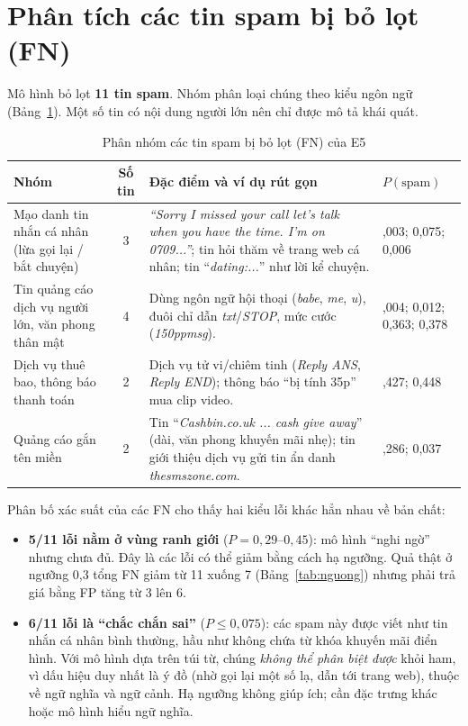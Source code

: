 \section{Phân tích các tin spam bị bỏ lọt (FN)}

Mô hình bỏ lọt \textbf{11 tin spam}. Nhóm phân loại chúng theo kiểu ngôn ngữ (Bảng~\ref{tab:fn}). Một số tin có nội dung người lớn nên chỉ được mô tả khái quát.

\begin{table}[H]
\centering
\caption{Phân nhóm các tin spam bị bỏ lọt (FN) của E5}
\label{tab:fn}
\small
\begin{tabular}{|>{\raggedright\arraybackslash}p{3.2cm}|c|>{\raggedright\arraybackslash}p{5.8cm}|>{\raggedright\arraybackslash}p{3cm}|}
\hline
\textbf{Nhóm} & \textbf{Số tin} & \textbf{Đặc điểm và ví dụ rút gọn} & \textbf{$P(\text{spam})$} \\
\hline
Mạo danh tin nhắn cá nhân (lừa gọi lại / bắt chuyện) & 3 & \textit{``Sorry I missed your call let's talk when you have the time. I'm on 0709...''}; tin hỏi thăm về trang web cá nhân; tin ``\textit{dating:...}'' như lời kể chuyện. & 0,003; 0,075; 0,006 \\
\hline
Tin quảng cáo dịch vụ người lớn, văn phong thân mật & 4 & Dùng ngôn ngữ hội thoại (\textit{babe}, \textit{me}, \textit{u}), đuôi chỉ dẫn \textit{txt}/\textit{STOP}, mức cước (\textit{150ppmsg}). & 0,004; 0,012; 0,363; 0,378 \\
\hline
Dịch vụ thuê bao, thông báo thanh toán & 2 & Dịch vụ tử vi/chiêm tinh (\textit{Reply ANS}, \textit{Reply END}); thông báo ``bị tính 35p'' mua clip video. & 0,427; 0,448 \\
\hline
Quảng cáo gắn tên miền & 2 & Tin ``\textit{Cashbin.co.uk ... cash give away}'' (dài, văn phong khuyến mãi nhẹ); tin giới thiệu dịch vụ gửi tin ẩn danh \textit{thesmszone.com}. & 0,286; 0,037 \\
\hline
\end{tabular}
\end{table}

Phân bố xác suất của các FN cho thấy hai kiểu lỗi khác hẳn nhau về bản chất:

\begin{itemize}
    \item \textbf{5/11 lỗi nằm ở vùng ranh giới} ($P=0{,}29$--$0{,}45$): mô hình ``nghi ngờ'' nhưng chưa đủ. Đây là các lỗi có thể giảm bằng cách hạ ngưỡng. Quả thật ở ngưỡng 0,3 tổng FN giảm từ 11 xuống 7 (Bảng~\ref{tab:nguong}) nhưng phải trả giá bằng FP tăng từ 3 lên 6.
    \item \textbf{6/11 lỗi là ``chắc chắn sai''} ($P\le0{,}075$): các spam này được viết như tin nhắn cá nhân bình thường, hầu như không chứa từ khóa khuyến mãi điển hình. Với mô hình dựa trên túi từ, chúng \textit{không thể phân biệt được} khỏi ham, vì dấu hiệu duy nhất là ý đồ (nhờ gọi lại một số lạ, dẫn tới trang web), thuộc về ngữ nghĩa và ngữ cảnh. Hạ ngưỡng không giúp ích; cần đặc trưng khác hoặc mô hình hiểu ngữ nghĩa.
\end{itemize}

